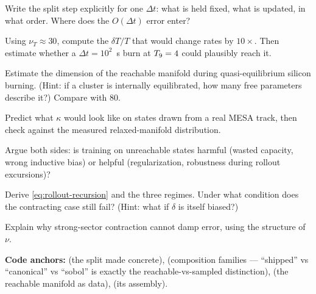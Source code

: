 \begin{selfcheck}
\item Write the split step explicitly for one $\Delta t$: what is held fixed,
      what is updated, in what order. Where does the $O(\Delta t)$ error enter?
\item Using $\nu_T \approx 30$, compute the $\delta T/T$ that would change rates
      by $10\times$. Then estimate whether a $\Delta t = 10^{2}$~s burn at
      $T_{9} = 4$ could plausibly reach it.
\item Estimate the dimension of the reachable manifold during quasi-equilibrium
      silicon burning. (Hint: if a cluster is internally equilibrated, how many
      free parameters describe it?) Compare with 80.
\item Predict what $\kappa$ would look like on states drawn from a real MESA
      track, then check against the measured relaxed-manifold distribution.
\item Argue both sides: is training on unreachable states harmful (wasted
      capacity, wrong inductive bias) or helpful (regularization, robustness
      during rollout excursions)?
\item Derive \eqref{eq:rollout-recursion} and the three regimes. Under what
      condition does the contracting case still fail? (Hint: what if $\delta$ is
      itself biased?)
\item Explain why strong-sector contraction cannot damp \Ye{} error, using the
      structure of $\nu$.
\end{selfcheck}

\begin{repopointer}
\textbf{Code anchors:}  (the split
made concrete),  (composition
families --- ``shipped'' vs ``canonical'' vs ``sobol'' is exactly the
reachable-vs-sampled distinction),  (the reachable
manifold as data),  (its assembly).
\end{repopointer}
